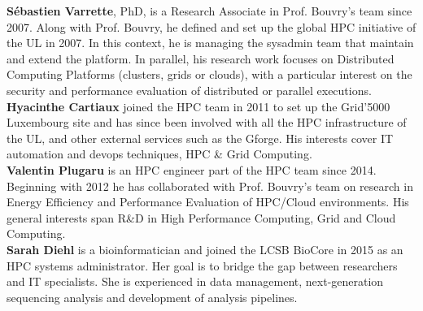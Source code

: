 \documentclass{beamer}
\begin{document}
{\begin{spacing}{0.5}
\begin{columns}[T]
\begin{column}[T]{0.8\textwidth}
     \vspace{2ex}
     {\tiny \textbf{S\'ebastien Varrette}, PhD, is a Research Associate in Prof. Bouvry's team since 2007. Along with Prof. Bouvry, he
     defined and set up the global HPC initiative of the UL in 2007. In this context, he is managing the sysadmin team that maintain 
     and extend the platform. In parallel, his research work focuses on Distributed Computing Platforms (clusters, grids or clouds),
     with a particular interest on the security and performance evaluation of distributed or parallel executions.}\\
    
     \vspace{1ex}
     {\tiny \textbf{Hyacinthe Cartiaux} joined the HPC team in 2011 to set up the Grid'5000 Luxembourg site and has since been involved with all 
     the HPC infrastructure of the UL, and other external services such as the Gforge. His interests cover IT automation and devops techniques, 
     HPC \& Grid Computing.}\\
     
     \vspace{2ex}
     {\tiny \textbf{Valentin Plugaru} is an HPC engineer part of the HPC team since 2014. Beginning with 2012 he has collaborated with Prof. 
     Bouvry's team on research in Energy Efficiency and Performance Evaluation of HPC/Cloud environments. His general interests span R\&D 
     in High Performance Computing, Grid and Cloud Computing.} \\
     
     \vspace{2.5ex}
     {\tiny \textbf{Sarah Diehl} is a bioinformatician and joined the LCSB BioCore in 2015 as an HPC systems administrator. Her goal is to 
     bridge the gap between researchers and IT specialists. She is experienced in data management, next-generation sequencing analysis and 
     development of analysis pipelines.}\\
   \end{column}
  \end{columns}
  
 \end{spacing}
}


\end{document}
